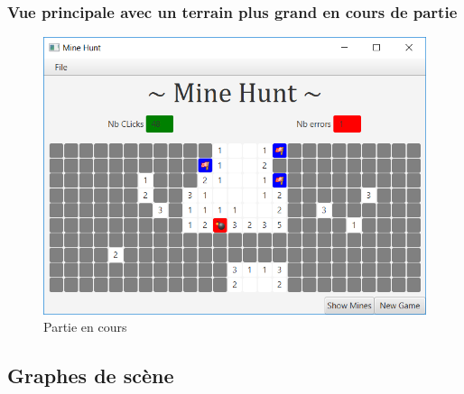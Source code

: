 \documentclass[a4paper, 10pt]{article}
\begin{document}
\subsubsection{Vue principale avec un terrain plus grand en cours de partie}
\begin{figure}[H]
\centering
\includegraphics[]{./partie_en_cours.png}
\caption{Partie en cours}
\end{figure}
\subsection{Graphes de scène}
\end{document}
